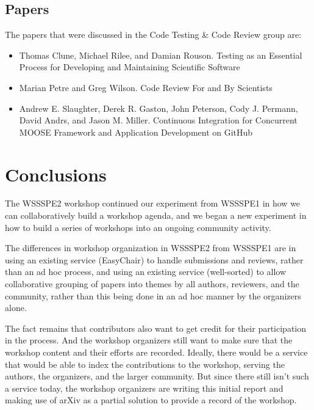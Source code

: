 \documentclass[11pt, oneside]{amsart}
\newcommand{\katznote}[1]{ {\textcolor{magenta}    { ***Dan:      #1 }}}
\newcommand{\clunenote}[1]{ {\textcolor{orange}    { ***Tom:      #1 }}}
\begin{document}


\subsection{Papers}

The papers that were discussed in the Code Testing \& Code Review group are:
\begin{itemize}
\item Thomas Clune, Michael Rilee, and Damian Rouson. Testing as an Essential
Process for Developing and Maintaining Scientific Software~\cite{wssspe2_clune}

\item Marian Petre and Greg Wilson. Code Review For and By
Scientists~\cite{wssspe2_petre}

\item Andrew E. Slaughter, Derek R. Gaston, John Peterson, Cody J. Permann,
David Andrs, and Jason M. Miller. Continuous Integration for Concurrent {MOOSE}
Framework and Application Development on {GitHub}~\cite{wssspe2_slaughter}
\end{itemize}

\section{Conclusions} \label{sec:conclusions}

The WSSSPE2 workshop continued our experiment from WSSSPE1 in how we can
collaboratively build a workshop agenda, and we began a new experiment in
how to build a series of workshops into an ongoing community activity.

The differences in workshop organization in WSSSPE2 from WSSSPE1
are in using an existing service (EasyChair) to handle submissions and reviews,
rather than an ad hoc process, and using an existing service (well-sorted) to
allow collaborative grouping of papers into themes by all authors, reviewers,
and the community, rather than this being done in an ad hoc manner by the
organizers alone.

The fact remains that contributors also want to get credit for their
participation in the process. And the workshop organizers still want to make
sure that the workshop content and their efforts are recorded. Ideally, there
would be a service that would be able to index the contributions to the
workshop, serving the authors, the organizers, and the larger community. But
since there still isn't such a service today, the workshop organizers are
writing this initial report and making use of arXiv as a partial solution to
provide a record of the workshop.
\end{document}
